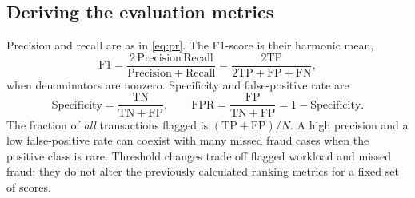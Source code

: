\documentclass[11pt,a4paper]{article}
\begin{document}
\subsection{Deriving the evaluation metrics}
Precision and recall are as in \eqref{eq:pr}. The F1-score is their harmonic mean,
\begin{equation}\mathrm{F1}=\frac{2\,\mathrm{Precision}\,\mathrm{Recall}}{\mathrm{Precision}+\mathrm{Recall}}=\frac{2\mathrm{TP}}{2\mathrm{TP}+\mathrm{FP}+\mathrm{FN}},\end{equation}
when denominators are nonzero. Specificity and false-positive rate are
\begin{equation}\mathrm{Specificity}=\frac{\mathrm{TN}}{\mathrm{TN}+\mathrm{FP}},\qquad \mathrm{FPR}=\frac{\mathrm{FP}}{\mathrm{TN}+\mathrm{FP}}=1-\mathrm{Specificity}.\end{equation}
The fraction of \emph{all} transactions flagged is $(\mathrm{TP}+\mathrm{FP})/N$. A high precision and a low false-positive rate can coexist with many missed fraud cases when the positive class is rare. Threshold changes trade off flagged workload and missed fraud; they do not alter the previously calculated ranking metrics for a fixed set of scores.
\end{document}
